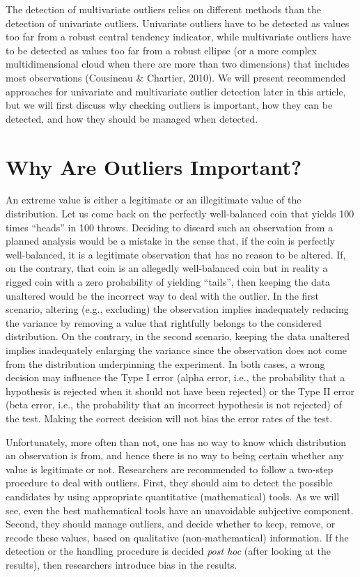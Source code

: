 \documentclass[man,floatsintext]{apa6}
\begin{document}
The detection of multivariate outliers relies on different methods than the detection of univariate outliers. Univariate outliers have to be detected as values too far from a robust central tendency indicator, while multivariate outliers have to be detected as values too far from a robust ellipse (or a more complex multidimensional cloud when there are more than two dimensions) that includes most observations (Cousineau \& Chartier, 2010). We will present recommended approaches for univariate and multivariate outlier detection later in this article, but we will first discuss why checking outliers is important, how they can be detected, and how they should be managed when detected.

\hypertarget{why-are-outliers-important}{%
\section{Why Are Outliers Important?}\label{why-are-outliers-important}}

An extreme value is either a legitimate or an illegitimate value of the distribution. Let us come back on the perfectly well-balanced coin that yields 100 times \enquote{heads} in 100 throws. Deciding to discard such an observation from a planned analysis would be a mistake in the sense that, if the coin is perfectly well-balanced, it is a legitimate observation that has no reason to be altered. If, on the contrary, that coin is an allegedly well-balanced coin but in reality a rigged coin with a zero probability of yielding \enquote{tails}, then keeping the data unaltered would be the incorrect way to deal with the outlier. In the first scenario, altering (e.g., excluding) the observation implies inadequately reducing the variance by removing a value that rightfully belongs to the considered distribution. On the contrary, in the second scenario, keeping the data unaltered implies inadequately enlarging the variance since the observation does not come from the distribution underpinning the experiment. In both cases, a wrong decision may influence the Type I error (alpha error, i.e., the probability that a hypothesis is rejected when it should not have been rejected) or the Type II error (beta error, i.e., the probability that an incorrect hypothesis is not rejected) of the test. Making the correct decision will not bias the error rates of the test.

Unfortunately, more often than not, one has no way to know which distribution an observation is from, and hence there is no way to being certain whether any value is legitimate or not. Researchers are recommended to follow a two-step procedure to deal with outliers. First, they should aim to detect the possible candidates by using appropriate quantitative (mathematical) tools. As we will see, even the best mathematical tools have an unavoidable subjective component. Second, they should manage outliers, and decide whether to keep, remove, or recode these values, based on qualitative (non-mathematical) information. If the detection or the handling procedure is decided \emph{post hoc} (after looking at the results), then researchers introduce bias in the results.
\end{document}
